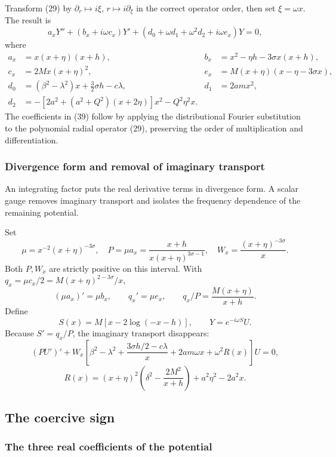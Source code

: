 \documentclass[11pt,a4paper]{article}
\begin{document}
Transform (29) by \(\partial_r\mapsto i\xi\), \(r\mapsto i\partial_\xi\)
in the correct operator order, then set \(\xi=\omega x\). The result is
\[
 a_xY''+(b_x+i\omega c_x)Y'
 +(d_0+\omega d_1+\omega^2d_2+i\omega e_x)Y=0,
 \tag{38}
\] where \[
\begin{aligned}
 a_x&=x(x+\eta)(x+h),&
 b_x&=x^2-\eta h-3\sigma x(x+h),\\
 c_x&=2Mx(x+\eta)^2,&
 e_x&=M(x+\eta)(x-\eta-3\sigma x),\\
 d_0&=(\beta^2-\lambda^2)x+\tfrac32\sigma h-c\lambda,&
 d_1&=2amx^2,\\
 d_2&=-[2a^2+(a^2+Q^2)(x+2\eta)]x^2-Q^2\eta^2x .
\end{aligned}
 \tag{39}
\] The coefficients in (39) follow by applying the distributional
Fourier substitution to the polynomial radial operator (29), preserving
the order of multiplication and differentiation.

\subsubsection{Divergence form and removal of imaginary transport}\label{readable-energy-gauge}

An integrating factor puts the real derivative terms in divergence form. A scalar gauge removes imaginary transport and isolates the frequency dependence of the remaining potential.

Set \[
 \mu=x^{-2}(x+\eta)^{-3\sigma},\quad
 P=\mu a_x=\frac{x+h}{x(x+\eta)^{3\sigma-1}},\quad
 W_x=\frac{(x+\eta)^{-3\sigma}}x .
 \tag{40}
\] Both \(P,W_x\) are strictly positive on this interval. With
\(q_x=\mu c_x/2=M(x+\eta)^{2-3\sigma}/x\), \[
 (\mu a_x)'=\mu b_x,\qquad q_x'=\mu e_x,\qquad
 q_x/P=\frac{M(x+\eta)}{x+h}.
 \tag{41}
\] Define \[
 S(x)=M[x-2\log(-x-h)],\qquad Y=e^{-i\omega S}U .
 \tag{42}
\] Because \(S'=q_x/P\), the imaginary transport disappears: \[
 (PU')'+W_x\left[
 \beta^2-\lambda^2+\frac{3\sigma h/2-c\lambda}{x}
 +2am\omega x+\omega^2R(x)\right]U=0,
 \tag{43}
\] \[
 R(x)=(x+\eta)^2\left(\delta^2-\frac{2M^2}{x+h}\right)
      +a^2\eta^2-2a^2x .
 \tag{44}
\]

\subsection{The coercive sign}\label{the-coercive-sign}

\subsubsection{The three real coefficients of the potential}\label{readable-coercive-potential}
\end{document}
